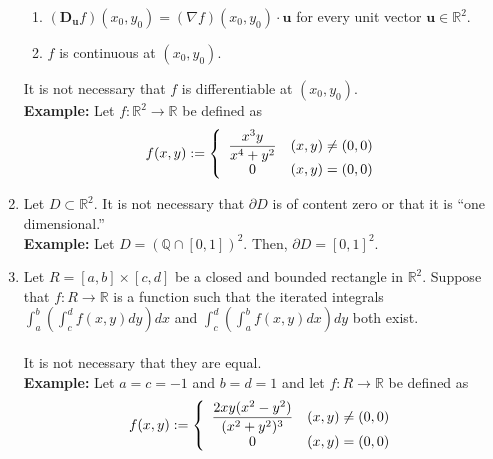 \documentclass{article}
\begin{document}
\begin{enumerate}
\begin{enumerate}[nosep]
		\item $(\mathbf{D_u}f)(x_0, y_0) = (\nabla f)(x_0, y_0)\cdot\mathbf{u}$ for every unit vector $\mathbf{u} \in \mathbb{R}^2.$
		\item $f$ is continuous at $(x_0, y_0).$
	\end{enumerate}
	It is not necessary that $f$ is differentiable at $(x_0, y_0).$\\
	\textbf{Example:} Let $f:\mathbb{R}^2 \to \mathbb{R}$ be defined as
	\[f(x, y) := \left\{
	\begin{array}{c c}
		\dfrac{x^3y}{x^4 + y^2} & (x, y) \neq (0, 0)\\
		0 & (x, y) = (0, 0)	
	\end{array}
	\right.\]
	\item Let $D \subset \mathbb{R}^2.$ It is not necessary that $\partial D$ is of content zero or that it is ``one dimensional.''\\
	\textbf{Example:} Let $D = (\mathbb{Q}\cap[0, 1])^2.$ Then, $\partial D = [0, 1]^2.$
	\item Let $R = [a, b] \times[c, d]$ be a closed and bounded rectangle in $\mathbb{R}^2.$ Suppose that $f:R\to\mathbb{R}$ is a function such that the iterated integrals $\displaystyle\int_{a}^{b} \left(\int_{c}^{d} f(x, y) dy\right) dx $ and $\displaystyle\int_{c}^{d} \left(\int_{a}^{b} f(x, y) dx\right) dy $ both exist.\\~\\
	It is not necessary that they are equal.\\
	\textbf{Example:} Let $a = c = - 1$ and $b = d = 1$ and let $f:R \to \mathbb{R}$ be defined as
	\[f(x, y) := \left\{
	\begin{array}{c c}
		\dfrac{2xy(x^2 - y^2)}{(x^2 + y^2)^3} & (x, y) \neq (0, 0)\\
		0 & (x, y) = (0, 0)	
	\end{array}
	\right.\]


\end{enumerate}
\end{document}
